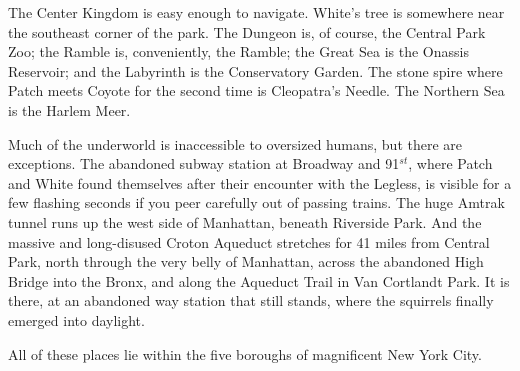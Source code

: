 \documentclass[12pt]{book}
\begin{document}
The Center Kingdom is easy enough to navigate. White's tree is somewhere near the southeast corner of the park. The Dungeon is, of course, the Central Park Zoo; the Ramble is, conveniently, the Ramble; the Great Sea is the Onassis Reservoir; and the Labyrinth is the Conservatory Garden. The stone spire where Patch meets Coyote for the second time is Cleopatra's Needle. The Northern Sea is the Harlem Meer.

Much of the underworld is inaccessible to oversized humans, but there are exceptions. The abandoned subway station at Broadway and 91$^{st}$, where Patch and White found themselves after their encounter with the Legless, is visible for a few flashing seconds if you peer carefully out of passing trains. The huge Amtrak tunnel runs up the west side of Manhattan, beneath Riverside Park. And the massive and long-disused Croton Aqueduct stretches for 41 miles from Central Park, north through the very belly of Manhattan, across the abandoned High Bridge into the Bronx, and along the Aqueduct Trail in Van Cortlandt Park. It is there, at an abandoned way station that still stands, where the squirrels finally emerged into daylight.

All of these places lie within the five boroughs of magnificent New York City.

\end{document}
